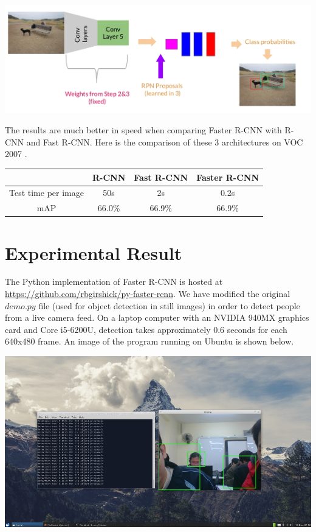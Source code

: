 \documentclass{article}
\begin{document}
\begin{enumerate}
	\begin{center}
		\includegraphics[scale=0.3]{faster_rcnn_step_4}
	\end{center}
\end{enumerate}

The results are much better in speed when comparing Faster R-CNN with R-CNN and Fast R-CNN. Here is the comparison of these 3 architectures on VOC 2007 \cite{videos/faster-rcnn}.
\begin{center}
	\begin{tabular}{| c | c | c | c |}
		\hline
		 & \textbf{R-CNN} & \textbf{Fast R-CNN}	& \textbf{Faster R-CNN} \\
		\hline
		Test time per image & 50s & 2s & 0.2s \\
		mAP & 66.0\% & 66.9\% & 66.9\%  \\
		\hline
	\end{tabular}
\end{center}

\section{Experimental Result}

The Python implementation of Faster R-CNN is hosted at \url{https://github.com/rbgirshick/py-faster-rcnn}. We have modified the original $demo.py$ file (used for object detection in still images) in order to detect people from a live camera feed. On a laptop computer with an NVIDIA 940MX graphics card and Core i5-6200U, detection takes approximately 0.6 seconds for each 640x480 frame. An image of the program running on Ubuntu is shown below. 

\begin{center}
	\includegraphics[scale=0.4]{faster_rcnn_result}
\end{center}

\clearpage
\printbibliography[title={References}]
\end{document}
